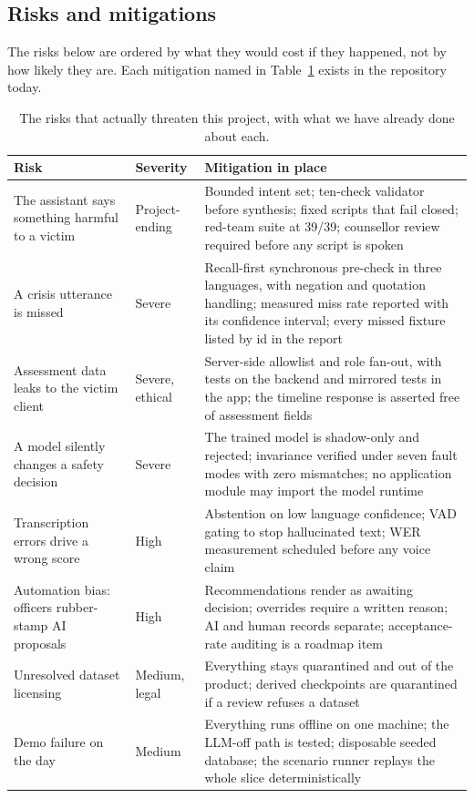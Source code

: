 \documentclass[11pt,a4paper]{article}
\begin{document}
\subsection{Risks and mitigations}
The risks below are ordered by what they would cost if they happened, not by how likely they are.
Each mitigation named in Table~\ref{tab:risks} exists in the repository today.

\begin{table}[!htbp]
\centering\footnotesize
\caption{The risks that actually threaten this project, with what we have already done about each.}
\label{tab:risks}
\begin{tabularx}{\linewidth}{@{}>{\raggedright\arraybackslash}p{3.6cm}>{\raggedright\arraybackslash}p{1.6cm}X@{}}
\toprule
Risk & Severity & Mitigation in place \\
\midrule
The assistant says something harmful to a victim & Project-ending & Bounded intent set; ten-check
validator before synthesis; fixed scripts that fail closed; red-team suite at 39/39; counsellor review
required before any script is spoken \\
A crisis utterance is missed & Severe & Recall-first synchronous pre-check in three languages, with
negation and quotation handling; measured miss rate reported with its confidence interval; every
missed fixture listed by id in the report \\
Assessment data leaks to the victim client & Severe, ethical & Server-side allowlist and role fan-out,
with tests on the backend and mirrored tests in the app; the timeline response is asserted free of
assessment fields \\
A model silently changes a safety decision & Severe & The trained model is shadow-only and rejected;
invariance verified under seven fault modes with zero mismatches; no application module may import the
model runtime \\
Transcription errors drive a wrong score & High & Abstention on low language confidence; VAD gating to
stop hallucinated text; WER measurement scheduled before any voice claim \\
Automation bias: officers rubber-stamp AI proposals & High & Recommendations render as awaiting
decision; overrides require a written reason; AI and human records separate; acceptance-rate auditing
is a roadmap item \\
Unresolved dataset licensing & Medium, legal & Everything stays quarantined and out of the product;
derived checkpoints are quarantined if a review refuses a dataset \\
Demo failure on the day & Medium & Everything runs offline on one machine; the LLM-off path is tested;
disposable seeded database; the scenario runner replays the whole slice deterministically \\
\bottomrule
\end{tabularx}
\end{table}
\end{document}
